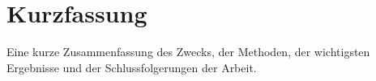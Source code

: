 \chapter*{Kurzfassung}
\label{abstract}

Eine kurze Zusammenfassung des Zwecks, der Methoden, der wichtigsten Ergebnisse und der Schlussfolgerungen der Arbeit.
